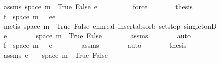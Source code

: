 \begin{isabellebody}
\ assms\ {\isacartoucheopen}space\ m\ {\isacharequal}{\kern0pt}\ {\isacharbraceleft}{\kern0pt}True{\isacharcomma}{\kern0pt}\ False{\isacharbraceright}{\kern0pt}{\isacartoucheclose}\ {\isacartoucheopen}e\ {\isacharequal}{\kern0pt}\ {}{\isacartoucheclose}\isanewline
\ \ \ \ \ \ \isamarkupfalse%
\ force\isanewline
\ \ \ \ \isamarkupfalse%
\ \isamarkupfalse%
\ {\isacharquery}{\kern0pt}thesis\isanewline
\ \ \ \ \ \ \isamarkupfalse%
\ {\isacartoucheopen}f\ {\isacharbackquote}{\kern0pt}\ space\ m\ {\isacharequal}{\kern0pt}\ {\isacharbraceleft}{\kern0pt}{}{\isacharcomma}{\kern0pt}\ e{\isacharbraceright}{\kern0pt}{\isacartoucheclose}{\isacartoucheopen}e\ {\isacharequal}{\kern0pt}\ {}{\isacartoucheclose}\isanewline
\ \ \ \ \ \ \isamarkupfalse%
\ {\isacharparenleft}{\kern0pt}metis\ {\isacartoucheopen}space\ m\ {\isacharequal}{\kern0pt}\ {\isacharbraceleft}{\kern0pt}True{\isacharcomma}{\kern0pt}\ False{\isacharbraceright}{\kern0pt}{\isacartoucheclose}\ ennreal{\isacharunderscore}{\kern0pt}{}\ insert{\isacharunderscore}{\kern0pt}absorb{}\ sets{\isachardot}{\kern0pt}top\ singletonD{\isacharparenright}{\kern0pt}\isanewline
\ \ \isamarkupfalse%
\ \isanewline
\ \ \ \ \isamarkupfalse%
\ {\isachardoublequoteopen}e\ {\isasymnoteq}\ {}{\isachardoublequoteclose}\isanewline
\ \ \ \ \isamarkupfalse%
\ {\isachardoublequoteopen}space\ m\ {\isacharequal}{\kern0pt}\ {\isacharbraceleft}{\kern0pt}True{\isacharcomma}{\kern0pt}\ False{\isacharbraceright}{\kern0pt}{\isachardoublequoteclose}\isanewline
\ \ \ \ \ \ \isamarkupfalse%
\ assms{\isacharparenleft}{\kern0pt}{}{\isacharparenright}{\kern0pt}\isanewline
\ \ \ \ \ \ \isamarkupfalse%
\ auto\isanewline
\ \ \ \ \isamarkupfalse%
\ \isamarkupfalse%
\ {\isachardoublequoteopen}f\ {\isacharbackquote}{\kern0pt}\ space\ m\ {\isacharequal}{\kern0pt}\ {\isacharbraceleft}{\kern0pt}{}{\isacharcomma}{\kern0pt}\ e{\isacharbraceright}{\kern0pt}{\isachardoublequoteclose}\isanewline
\ \ \ \ \ \ \isamarkupfalse%
\ assms{\isacharparenleft}{\kern0pt}{}{\isacharparenright}{\kern0pt}\isanewline
\ \ \ \ \ \ \isamarkupfalse%
\ auto\isanewline
\ \ \ \ \isamarkupfalse%
\ \isamarkupfalse%
\ {\isacharquery}{\kern0pt}thesis\isanewline
\ \ \ \ \ \ \isamarkupfalse%
\ assms\ {\isacartoucheopen}e\ {\isasymnoteq}\ {}{\isacartoucheclose}\ \ {\isacartoucheopen}space\ m\ {\isacharequal}{\kern0pt}\ {\isacharbraceleft}{\kern0pt}True{\isacharcomma}{\kern0pt}\ False{\isacharbraceright}{\kern0pt}{\isacartoucheclose}\isanewline

\end{isabellebody}
